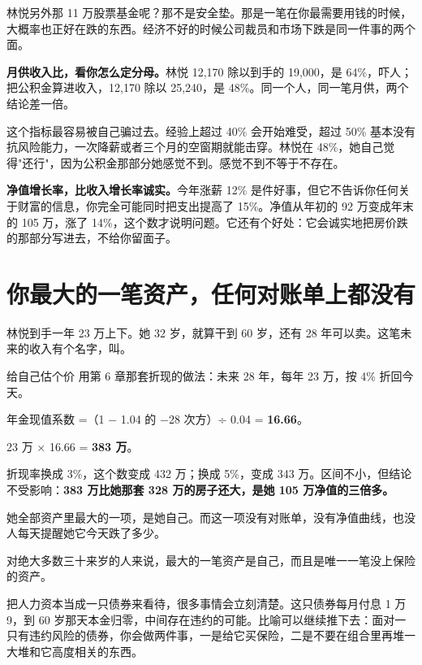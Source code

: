 林悦另外那 11 万股票基金呢？那不是安全垫。那是一笔在你最需要用钱的时候，大概率也正好在跌的东西。经济不好的时候公司裁员和市场下跌是同一件事的两个面。

\textbf{月供收入比，看你怎么定分母。}林悦 12,170 除以到手的 19,000，是 64\%，吓人；把公积金算进收入，12,170 除以 25,240，是 48\%。同一个人，同一笔月供，两个结论差一倍。

这个指标最容易被自己骗过去。经验上超过 40\% 会开始难受，超过 50\% 基本没有抗风险能力，一次降薪或者三个月的空窗期就能击穿。林悦在 48\%，她自己觉得"还行"，因为公积金那部分她感觉不到。感觉不到不等于不存在。

\textbf{净值增长率，比收入增长率诚实。}今年涨薪 12\% 是件好事，但它不告诉你任何关于财富的信息，你完全可能同时把支出提高了 15\%。净值从年初的 92 万变成年末的 105 万，涨了 14\%，这个数才说明问题。它还有个好处：它会诚实地把房价跌的那部分写进去，不给你留面子。

\section{你最大的一笔资产，任何对账单上都没有}

林悦到手一年 23 万上下。她 32 岁，就算干到 60 岁，还有 28 年可以卖。这笔未来的收入有个名字，叫。

\begin{egbox}{给自己估个价}
用第 6 章那套折现的做法：未来 28 年，每年 23 万，按 4\% 折回今天。

年金现值系数 =（1 − 1.04 的 −28 次方）÷ 0.04 = \textbf{16.66}。

23 万 × 16.66 = \textbf{383 万}。

折现率换成 3\%，这个数变成 432 万；换成 5\%，变成 343 万。区间不小，但结论不受影响：\textbf{383 万比她那套 328 万的房子还大，是她 105 万净值的三倍多。}

她全部资产里最大的一项，是她自己。而这一项没有对账单，没有净值曲线，也没人每天提醒她它今天跌了多少。

\end{egbox}

\begin{pullquote}{}
对绝大多数三十来岁的人来说，最大的一笔资产是自己，而且是唯一一笔没上保险的资产。
\end{pullquote}

把人力资本当成一只债券来看待，很多事情会立刻清楚。这只债券每月付息 1 万 9，到 60 岁那天本金归零，中间存在违约的可能。比喻可以继续推下去：面对一只有违约风险的债券，你会做两件事，一是给它买保险，二是不要在组合里再堆一大堆和它高度相关的东西。

